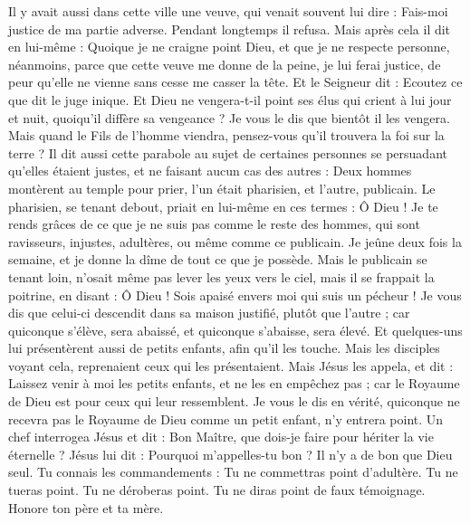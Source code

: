 \begin{multicols}{2}
Il y avait aussi dans cette ville une veuve, qui venait souvent lui dire : Fais-moi justice de ma partie adverse.
Pendant longtemps il refusa. Mais après cela il dit en lui-même : Quoique je ne craigne point Dieu, et que je ne respecte personne,
néanmoins, parce que cette veuve me donne de la peine, je lui ferai justice, de peur qu'elle ne vienne sans cesse me casser la tête.
Et le Seigneur dit : Ecoutez ce que dit le juge inique.
Et Dieu ne vengera-t-il point ses élus qui crient à lui jour et nuit, quoiqu'il diffère sa vengeance ?
Je vous le dis que bientôt il les vengera. Mais quand le Fils de l'homme viendra, pensez-vous qu'il trouvera la foi sur la terre ?
Il dit aussi cette parabole au sujet de certaines personnes se persuadant qu'elles étaient justes, et ne faisant aucun cas des autres :
Deux hommes montèrent au temple pour prier, l'un était pharisien, et l'autre, publicain.
Le pharisien, se tenant debout, priait en lui-même en ces termes : Ô Dieu ! Je te rends grâces de ce que je ne suis pas comme le reste des hommes, qui sont ravisseurs, injustes, adultères, ou même comme ce publicain.
Je jeûne deux fois la semaine, et je donne la dîme de tout ce que je possède.
Mais le publicain se tenant loin, n'osait même pas lever les yeux vers le ciel, mais il se frappait la poitrine, en disant : Ô Dieu ! Sois apaisé envers moi qui suis un pécheur !
Je vous dis que celui-ci descendit dans sa maison justifié, plutôt que l'autre ; car quiconque s'élève, sera abaissé, et quiconque s'abaisse, sera élevé.
Et quelques-uns lui présentèrent aussi de petits enfants, afin qu'il les touche. Mais les disciples voyant cela, reprenaient ceux qui les présentaient.
Mais Jésus les appela, et dit : Laissez venir à moi les petits enfants, et ne les en empêchez pas ; car le Royaume de Dieu est pour ceux qui leur ressemblent.
Je vous le dis en vérité, quiconque ne recevra pas le Royaume de Dieu comme un petit enfant, n'y entrera point.
Un chef interrogea Jésus et dit : Bon Maître, que dois-je faire pour hériter la vie éternelle ?
Jésus lui dit : Pourquoi m'appelles-tu bon ? Il n'y a de bon que Dieu seul.
Tu connais les commandements : Tu ne commettras point d'adultère. Tu ne tueras point. Tu ne déroberas point. Tu ne diras point de faux témoignage. Honore ton père et ta mère.

\end{multicols}
